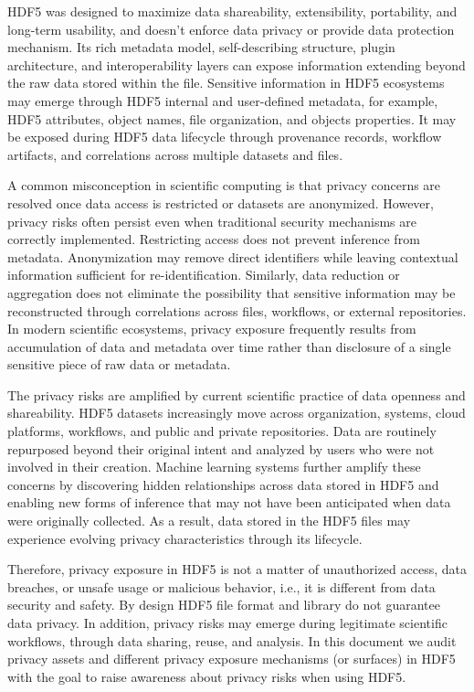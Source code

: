\documentclass[../main.tex]{subfiles}
\begin{document}
HDF5 was designed to maximize data shareability, extensibility, portability, and long-term usability, 
and doesn’t enforce data privacy or provide data protection mechanism. Its rich metadata model, 
self-describing structure, plugin architecture, and interoperability layers can expose information 
extending beyond the raw data stored within the file. Sensitive information in HDF5 ecosystems may emerge 
through HDF5 internal and user-defined metadata, for example, HDF5 attributes, object names, 
file organization, and objects properties. It may be exposed during HDF5 data lifecycle through 
provenance records, workflow artifacts, and correlations across multiple datasets and files. 

A common misconception in scientific computing is that privacy concerns are resolved once 
data access is restricted or datasets are anonymized. However, privacy risks often persist even 
when traditional security mechanisms are correctly implemented. Restricting access does not prevent 
inference from metadata. Anonymization may remove direct identifiers while leaving contextual 
information sufficient for re-identification. Similarly, data reduction or aggregation does not 
eliminate the possibility that sensitive information may be reconstructed through correlations 
across files, workflows, or external repositories. In modern scientific ecosystems, privacy 
exposure frequently results from accumulation of data and metadata over time rather than disclosure 
of a single sensitive piece of raw data or metadata.

The privacy risks are amplified by current scientific practice of data openness and shareability.  
HDF5 datasets increasingly move across organization, systems, cloud platforms, workflows, and public 
and private repositories. Data are routinely repurposed beyond their original intent and analyzed by 
users who were not involved in their creation. Machine learning systems further amplify these concerns 
by discovering hidden relationships across data stored in HDF5 and enabling new forms of inference 
that may not have been anticipated when data were originally collected. As a result, data stored in 
the HDF5 files may experience evolving privacy characteristics through its lifecycle.

Therefore, privacy exposure in HDF5 is not a matter of unauthorized access, data breaches, 
or unsafe usage or malicious behavior, i.e., it is different from data security and safety.  
By design HDF5 file format and library do not guarantee data privacy. In addition, privacy risks may 
emerge during legitimate scientific workflows, through data sharing, reuse, and analysis.
In this document we audit privacy assets and different privacy exposure mechanisms (or surfaces) 
in HDF5 with the goal to raise awareness about privacy risks when using HDF5. 
\end{document}
